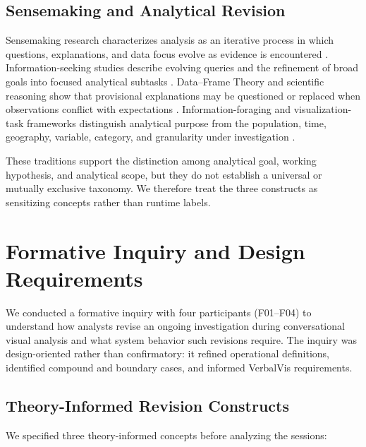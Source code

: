 \documentclass[journal]{IEEEtran}
\begin{document}
\subsection{Sensemaking and Analytical Revision}
\label{sec:rw-sensemaking}

Sensemaking research characterizes analysis as an iterative process in which questions, explanations, and data focus evolve as evidence is encountered \cite{russell1993cost,pirolli2005sensemaking,sacha2014knowledge}. Information-seeking studies describe evolving queries and the refinement of broad goals into focused analytical subtasks \cite{bates1989berrypicking,vakkari2001changes,battle2019characterizing}. Data--Frame Theory and scientific reasoning show that provisional explanations may be questioned or replaced when observations conflict with expectations \cite{klein2007dataframe,klahr1988dual,chinn1993anomalous}. Information-foraging and visualization-task frameworks distinguish analytical purpose from the population, time, geography, variable, category, and granularity under investigation \cite{pirolli1999information,brehmer2013multilevel,wongsuphasawat2016voyager}.

These traditions support the distinction among analytical goal, working hypothesis, and analytical scope, but they do not establish a universal or mutually exclusive taxonomy. We therefore treat the three constructs as sensitizing concepts rather than runtime labels.

\section{Formative Inquiry and Design Requirements}
\label{sec:formative}

We conducted a formative inquiry with four participants (F01--F04) to understand how analysts revise an ongoing investigation during conversational visual analysis and what system behavior such revisions require. The inquiry was design-oriented rather than confirmatory: it refined operational definitions, identified compound and boundary cases, and informed VerbalVis requirements.

\subsection{Theory-Informed Revision Constructs}
\label{sec:formative-constructs}

We specified three theory-informed concepts before analyzing the sessions:
\end{document}
